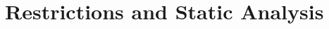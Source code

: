 \documentclass[times, 10pt]{article}
\begin{document}
\begin{align*}
\end{align*}

\section{Restrictions and Static Analysis}
\end{document}
